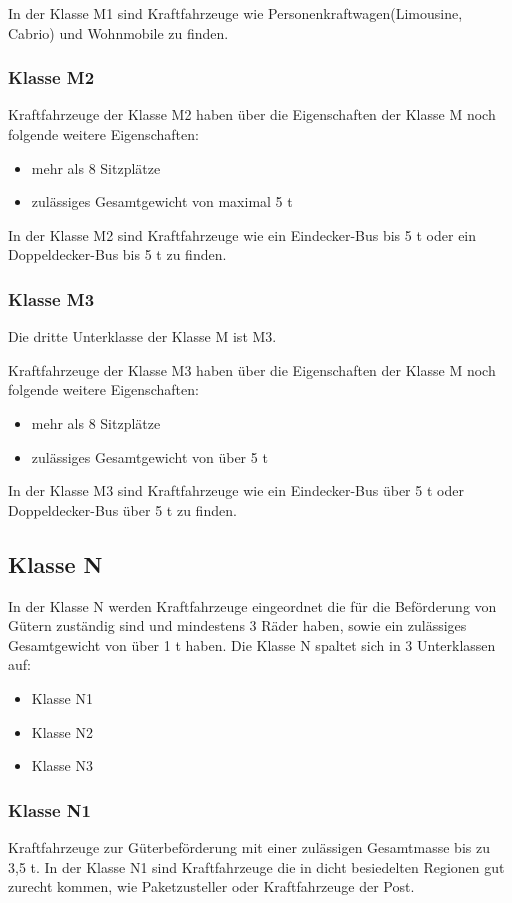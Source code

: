 In der Klasse M1 sind Kraftfahrzeuge wie Personenkraftwagen(Limousine, Cabrio) und Wohnmobile zu finden.

\subsubsection{Klasse M2}
Kraftfahrzeuge der Klasse M2 haben über die Eigenschaften der Klasse M noch folgende weitere Eigenschaften:
\begin{itemize}
	\item {mehr als 8 Sitzplätze}
	\item {zulässiges Gesamtgewicht von maximal 5 \ac{t}}
\end{itemize}

In der Klasse M2 sind Kraftfahrzeuge wie ein Eindecker-Bus bis 5 \ac{t} oder ein Doppeldecker-Bus bis 5 \ac{t} zu finden.
\newpage

\subsubsection{Klasse M3}

Die dritte Unterklasse der Klasse M ist M3.

Kraftfahrzeuge der Klasse M3 haben über die Eigenschaften der Klasse M noch folgende weitere Eigenschaften:
\begin{itemize}
	\item {mehr als 8 Sitzplätze}
	\item {zulässiges Gesamtgewicht von über 5 \ac{t}}
\end{itemize}

In der Klasse M3 sind Kraftfahrzeuge wie ein Eindecker-Bus über 5 \ac{t} oder Doppeldecker-Bus über 5 \ac{t} zu finden.

\subsection*{Klasse N}
In der Klasse N werden Kraftfahrzeuge eingeordnet die für die Beförderung von Gütern zuständig sind und mindestens 3 Räder haben, sowie ein zulässiges Gesamtgewicht von über 1 \ac{t} haben.
Die Klasse N spaltet sich in 3 Unterklassen auf:
\begin{itemize}
	\item {Klasse N1}
	\item {Klasse N2}
	\item {Klasse N3}
\end{itemize}

\subsubsection{Klasse N1}
Kraftfahrzeuge zur Güterbeförderung mit einer zulässigen Gesamtmasse bis zu 3,5 \ac{t}.
In der Klasse N1 sind Kraftfahrzeuge die in dicht besiedelten Regionen gut zurecht kommen, wie Paketzusteller oder Kraftfahrzeuge der Post.


